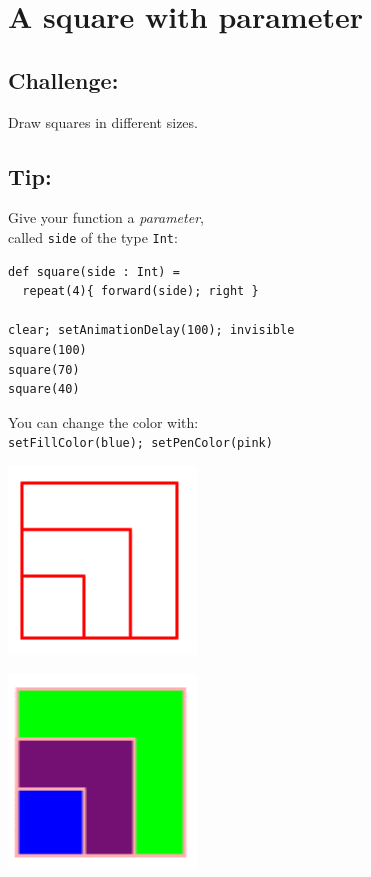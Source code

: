 \chapter{A square with parameter}
\begin{multicols}{2}
\section*{\color{BrickRed}Challenge:}
Draw squares in different sizes.
\section*{\color{OliveGreen}Tip:}
Give your function a {\it parameter},\\
called \lstinline{side} of the type \lstinline{Int}:

\begin{lstlisting}[basicstyle={\ttfamily\fontsize{16}{19}\selectfont},numbers=none]
def square(side : Int) = 
  repeat(4){ forward(side); right }

clear; setAnimationDelay(100); invisible
square(100) 
square(70)
square(40)
\end{lstlisting}
        
You can change the color with:\\
\lstinline{setFillColor(blue); setPenColor(pink)}


\columnbreak


\begin{center}
\includegraphics[width=5.0cm]{../img/square-param.png}
\end{center}

\begin{center}
\includegraphics[width=5.0cm]{../img/square-param-color.png}
\end{center}

\end{multicols}

